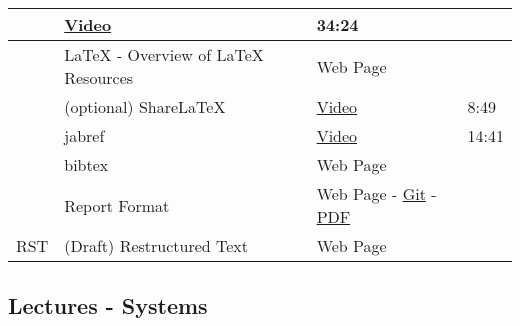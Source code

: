 \begin{threeparttable}
\begin{tabulary}{\linewidth}{|L|L|L|L|}
&
\href{https://www.youtube.com/watch?v=g3dkRsTqdDA}{Video}
&
34:24
\\
\hline&
LaTeX - Overview of LaTeX Resources
&
Web Page
&\\
\hline&
(optional) ShareLaTeX
&
\href{https://youtu.be/PfhSOjuQk8Y}{Video}
&
8:49
\\
\hline&
jabref
&
\href{https://youtu.be/cMtYOHCHZ3k}{Video}
&
14:41
\\
\hline&
bibtex
&
Web Page
&\\
\hline&
Report Format
&
Web Page - \href{https://github.com/cloudmesh/classes/tree/master/docs/source/format/report}{Git} - \href{https://github.com/cloudmesh/classes/tree/master/docs/source/format/report}{PDF}
&\\
\hline
RST
&
(Draft) Restructured Text
&
Web Page
&\\
\hline\end{tabulary}

\end{threeparttable}



\subsection{Lectures - Systems}
\label{\detokenize{i524/lectures:lectures-systems}}

